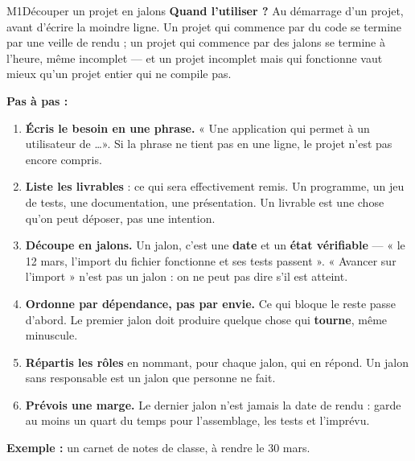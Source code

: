 \begin{fichemethode}{M1}{Découper un projet en jalons}
\textbf{Quand l'utiliser ?} Au démarrage d'un projet, avant d'écrire la moindre ligne. Un
projet qui commence par du code se termine par une veille de rendu ; un projet qui commence
par des jalons se termine à l'heure, même incomplet — et un projet incomplet mais qui
fonctionne vaut mieux qu'un projet entier qui ne compile pas.

\textbf{Pas à pas :}
\begin{enumerate}
  \item \textbf{Écris le besoin en une phrase.} « Une application qui permet à un
    utilisateur de \dots ». Si la phrase ne tient pas en une ligne, le projet n'est pas
    encore compris.
  \item \textbf{Liste les livrables} : ce qui sera effectivement remis. Un programme, un
    jeu de tests, une documentation, une présentation. Un livrable est une chose qu'on peut
    déposer, pas une intention.
  \item \textbf{Découpe en jalons.} Un jalon, c'est une \textbf{date} et un
    \textbf{état vérifiable} — « le 12 mars, l'import du fichier fonctionne et ses tests
    passent ». « Avancer sur l'import » n'est pas un jalon : on ne peut pas dire s'il est
    atteint.
  \item \textbf{Ordonne par dépendance, pas par envie.} Ce qui bloque le reste passe
    d'abord. Le premier jalon doit produire quelque chose qui \textbf{tourne}, même minuscule.
  \item \textbf{Répartis les rôles} en nommant, pour chaque jalon, qui en répond. Un jalon
    sans responsable est un jalon que personne ne fait.
  \item \textbf{Prévois une marge.} Le dernier jalon n'est jamais la date de rendu : garde au
    moins un quart du temps pour l'assemblage, les tests et l'imprévu.
\end{enumerate}

\textbf{Exemple :} un carnet de notes de classe, à rendre le $30$ mars.


\end{fichemethode}
